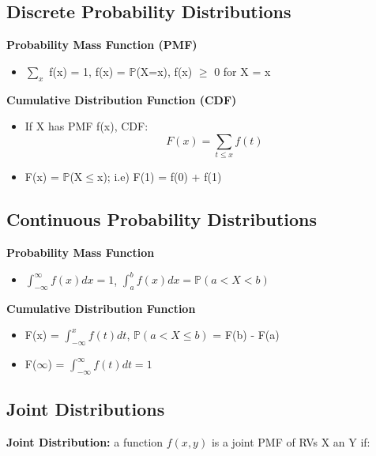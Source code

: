 \documentclass[10pt, letterpaper, twoside]{article}
\begin{document}
\begin{multicols}{2}
\subsection{Discrete Probability Distributions}
\textbf{Probability Mass Function (PMF)}
\begin{itemize}
    \item $\sum_x$ f(x) = 1, f(x) = $\mathbb{P}$(X=x), f(x) $\geq$ 0 for X = x
\end{itemize}
\textbf{Cumulative Distribution Function (CDF)}
\begin{itemize}
    \item If X has PMF f(x), CDF:
    \begin{equation*}
        F(x) = \sum_{t\leq x}f(t)
    \end{equation*}
    \item F(x) = $\mathbb{P}$(X$\leq$x); i.e) F(1) = f(0) + f(1)
\end{itemize}

\subsection{Continuous Probability Distributions}
\textbf{Probability Mass Function}
\begin{itemize}
    \item $\int_{-\infty}^{\infty}f(x)dx = 1$, $\int_a^b f(x)dx = \mathbb{P}(a < X < b)$  
\end{itemize}
\textbf{Cumulative Distribution Function}
\begin{itemize}
    \item F(x) = $\int_{-\infty}^xf(t)dt$, $\mathbb{P}(a < X\leq b)$ = F(b) - F(a)
    \item F($\infty$) = $\int_{-\infty}^{\infty}f(t)dt = 1$
\end{itemize}
\subsection{Joint Distributions}

\textbf{Joint Distribution:} a function $f(x,y)$ is a joint PMF of RVs X an Y if:


\end{multicols}
\end{document}
